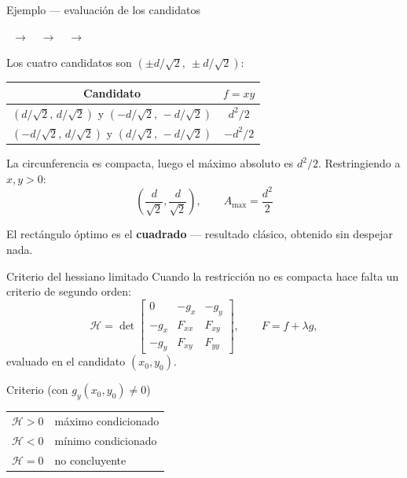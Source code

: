 \documentclass[11pt,aspectratio=169]{beamer}
\newcommand{\lgtracker}[1]{%
  {\footnotesize\centering
  \pasoitem{1}{1. Función de Lagrange}{#1}\ $\rightarrow$\
  \pasoitem{2}{2. Sistema $\nabla F=\mathbf 0$}{#1}\ $\rightarrow$\
  \pasoitem{3}{3. Candidatos}{#1}\ $\rightarrow$\
  \pasoitem{4}{4. Clasificación}{#1}\par}
  \vspace{4pt}
}
\begin{document}
\begin{frame}{Ejemplo --- evaluación de los candidatos}
  \lgtracker{4}
  Los cuatro candidatos son $(\pm d/\sqrt2,\ \pm d/\sqrt2)$:
  \begin{center}
  \begin{tabular}{cc}
    \toprule
    \textbf{Candidato} & $f=xy$ \\
    \midrule
    $(d/\sqrt2,\,d/\sqrt2)$ y $(-d/\sqrt2,\,-d/\sqrt2)$ & $d^2/2$ \\
    $(-d/\sqrt2,\,d/\sqrt2)$ y $(d/\sqrt2,\,-d/\sqrt2)$ & $-d^2/2$ \\
    \bottomrule
  \end{tabular}
  \end{center}
  \pause
  \vspace{6pt}
  La circunferencia es compacta, luego el máximo absoluto es $d^2/2$. Restringiendo a $x,y>0$:
  \[
    \boxed{\left(\frac{d}{\sqrt2},\frac{d}{\sqrt2}\right),\qquad A_{\max}=\frac{d^2}{2}}
  \]
  \pause
  \begin{center}\small\color{tealx} El rectángulo óptimo es el \textbf{cuadrado} --- resultado clásico, obtenido sin despejar nada.\end{center}
\end{frame}

\begin{frame}{Criterio del hessiano limitado}
  Cuando la restricción no es compacta hace falta un criterio de segundo orden:
  \[
    \mathcal H=\det\begin{bmatrix}
      0 & -g_x & -g_y \\
      -g_x & F_{xx} & F_{xy} \\
      -g_y & F_{xy} & F_{yy}
    \end{bmatrix},
    \qquad F=f+\lambda g,
  \]
  evaluado en el candidato $(x_0,y_0)$.
  \pause
  \begin{block}{Criterio (con $g_y(x_0,y_0)\neq 0$)}
    \begin{center}
    \begin{tabular}{ll}
      \toprule
      $\mathcal H>0$ & máximo condicionado \\
      $\mathcal H<0$ & mínimo condicionado \\
      $\mathcal H=0$ & no concluyente \\
      \bottomrule
    \end{tabular}
    \end{center}
  \end{block}
\end{frame}
\end{document}
